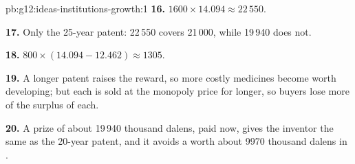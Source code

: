 \begin{solution}{pb:g12:ideas-institutions-growth:1}
\textbf{16.} $1600 \times 14.094 \approx 22\,550$.

\textbf{17.} Only the 25-year patent: 22\,550 covers 21\,000, while 19\,940 does not.

\textbf{18.} $800 \times (14.094 - 12.462) \approx 1305$.

\textbf{19.} A longer patent raises the reward, so more costly medicines become worth developing; but each is sold at the monopoly price for longer, so buyers lose more
of the surplus of each.

\textbf{20.} A prize of about 19\,940 thousand dalens, paid now, gives the inventor the same  as the 20-year patent, and it avoids a  worth about
9970 thousand dalens in .
\end{solution}
